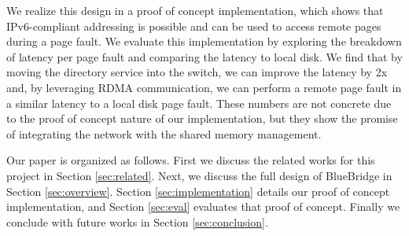 We realize this design in a proof of concept implementation, which shows that IPv6-compliant addressing is possible and can be used to access remote pages during a page fault. We evaluate this implementation by exploring the breakdown of latency per page fault and comparing the latency to local disk. We find that by moving the directory service into the switch, we can improve the latency by 2x and, by leveraging RDMA communication, we can perform a remote page fault in a similar latency to a local disk page fault. These numbers are not concrete due to the proof of concept nature of our implementation, but they show the promise of integrating the network with the shared memory management.

Our paper is organized as follows. First we discuss the related works for this project in Section \ref{sec:related}. Next, we discuss the full design of BlueBridge in Section \ref{sec:overview}. Section \ref{sec:implementation} details our proof of concept implementation, and Section \ref{sec:eval} evaluates that proof of concept. Finally we conclude with future works in Section \ref{sec:conclusion}. 